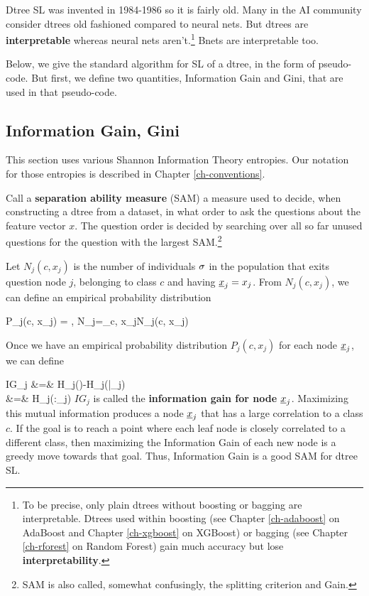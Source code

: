 Dtree SL was invented in 1984-1986 so it
is fairly old.
Many in the AI
community 
consider dtrees old fashioned
compared to neural nets.
But dtrees 
are {\bf interpretable} whereas neural nets aren't.\footnote{
To be precise, only
plain dtrees without boosting or
 bagging
are interpretable.
Dtrees used within boosting
(see Chapter \ref{ch-adaboost} on AdaBoost
and
Chapter \ref{ch-xgboost} on XGBoost)
or bagging
(see Chapter \ref{ch-rforest} on Random Forest)
gain much
accuracy but lose
{\bf interpretability}.}
Bnets are interpretable too.


Below,
we give the standard
algorithm for SL
of a dtree, in the form
of pseudo-code.
But first,
we define
two quantities,
Information Gain and
Gini,
that are 
used in that 
pseudo-code.


\subsection{Information Gain, Gini}
This section uses various Shannon Information Theory
entropies. Our 
notation for those
entropies
is described in Chapter \ref{ch-conventions}.


Call a {\bf separation ability measure} (SAM)
a measure used 
to decide, when 
constructing a dtree from a dataset,
in what order 
to ask the questions
about the feature vector $x$.
The question order is decided
by searching 
over all so far unused questions
for the question with 
the largest SAM.\footnote{SAM
is also called, somewhat
confusingly, the splitting
criterion and Gain.}




Let $N_j(c, x_j)$ is the number
of individuals $\sigma$
in the population that exits question node $j$,
belonging to class $c$ and having $\rvx_j=x_j$.
From $N_j(c, x_j)$, we can define 
an empirical
probability distribution 

\beq
P_j(c, x_j)
=
\;,\;\; 
N_j=\sum_{c, x_j}N_j(c, x_j)
\eeq

Once
we have an empirical probability distribution
$P_j(c, x_j)$ for each node $\rvx_j$,
we can define

\beqa
IG_j
&=&
H_j(\rvc)-H_j(\rvc|\rvx_j)
\\
&=& H_j(\rvc:\rvx_j)
\label{eq-info-gain}
\eeqa
$IG_j$
is called the {\bf
information gain
for node $\rvx_j$}.
Maximizing this mutual information
produces 
a node $\rvx_j$ that has 
a large correlation
to a class $c$.
If the  
goal is to reach
a point 
where each leaf node is
closely correlated
to a different class,
then maximizing the
Information Gain
of each new node
is a greedy move
towards that goal.
Thus, Information Gain
is a good 
SAM
for dtree SL.

